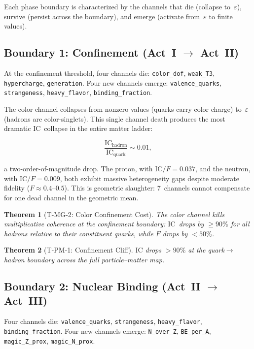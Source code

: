 \documentclass[
  aps,
  prd,
  twocolumn,
  superscriptaddress,
  nofootinbib,
  floatfix
]{revtex4-2}
\newtheorem{theorem}{Theorem}
\newcommand{\eps}{\varepsilon}
\newcommand{\beq}{\begin{equation}}
\newcommand{\eeq}{\end{equation}}
\newcommand{\IC}{\mathrm{IC}}
\begin{document}
Each phase boundary is characterized by the channels that
die (collapse to~$\eps$), survive (persist across the boundary),
and emerge (activate from~$\eps$ to finite values).

\subsection{Boundary 1: Confinement (Act~I $\to$ Act~II)}
\label{sec:confinement}

At the confinement threshold, four channels die:
\texttt{color\_dof}, \texttt{weak\_T3}, \texttt{hypercharge},
\texttt{generation}.  Four new channels emerge:
\texttt{valence\_quarks}, \texttt{strangeness},
\texttt{heavy\_flavor}, \texttt{binding\_fraction}.

The color channel collapses from nonzero values (quarks carry
color charge) to~$\eps$ (hadrons are color-singlets).  This
single channel death produces the most dramatic $\IC$~collapse
in the entire matter ladder:

\beq\label{eq:confinement}
  \frac{\IC_{\text{hadron}}}{\IC_{\text{quark}}} \sim 0.01,
\eeq

a two-order-of-magnitude drop.  The proton, with
$\IC/F = 0.037$, and the neutron, with $\IC/F = 0.009$, both
exhibit massive heterogeneity gaps despite moderate fidelity
($F \approx 0.4$--$0.5$).  This is geometric slaughter:
7~channels cannot compensate for one dead channel in the
geometric mean.

\begin{theorem}[T-MG-2: Color Confinement Cost]
\label{thm:confinement}
The color channel kills multiplicative coherence at the
confinement boundary: $\IC$~drops by $\geq 90\%$ for all
hadrons relative to their constituent quarks, while $F$
drops by $< 50\%$.
\end{theorem}

\begin{theorem}[T-PM-1: Confinement Cliff]
\label{thm:cliff}
$\IC$ drops $> 90\%$ at the quark$\to$hadron boundary across
the full particle--matter map.
\end{theorem}

\subsection{Boundary 2: Nuclear Binding (Act~II $\to$ Act~III)}
\label{sec:nuclear}

Four channels die: \texttt{valence\_quarks},
\texttt{strangeness}, \texttt{heavy\_flavor},
\texttt{binding\_fraction}.
Four new channels emerge: \texttt{N\_over\_Z},
\texttt{BE\_per\_A}, \texttt{magic\_Z\_prox},
\texttt{magic\_N\_prox}.
\end{document}
